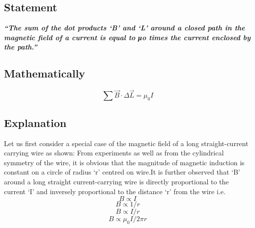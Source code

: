  \subsection{Statement}
 \textit{\textbf{“The sum of the dot products ‘B’ and ‘L’ around a closed path in the magnetic field of a current is equal to μo times the current enclosed by the path.”}}
 
 \subsection{Mathematically}
 \begin{equation}
\sum \vec{B}\cdot\Delta\vec{L}= \mu_{0}I \nonumber  
\end{equation}

\subsection{Explanation}
Let us first consider a special case of the magnetic field of a
long straight-current carrying wire as shown:
From experiments as well as from the cylindrical symmetry of the wire,
it is obvious that the magnitude of magnetic induction is constant on
a circle of radius ‘r’ centred on wire.It is further observed that ‘B’
around a long straight current-carrying wire is directly proportional
to the current ‘I’ and inversely proportional to the distance ‘r’ from
the wire i.e.
\begin{equation}
    B \propto I \nonumber
\end{equation}
\begin{equation}
    B \propto 1/r \nonumber
\end{equation}
\begin{equation}
    B \propto I/r \nonumber
\end{equation}
\begin{equation}
    B \propto \mu_{0}I/2\pi r \nonumber
\end{equation}

